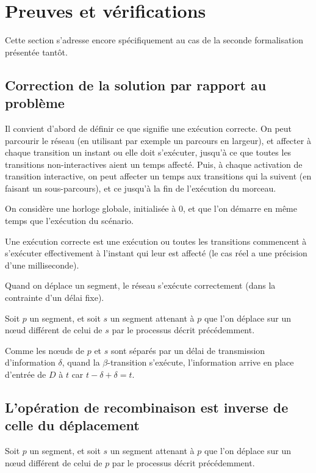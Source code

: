 \section{Preuves et vérifications}
Cette section s'adresse encore spécifiquement au cas de la seconde formalisation présentée tantôt.

\subsection{Correction de la solution par rapport au problème} 
Il convient d'abord de définir ce que signifie une exécution correcte.
On peut parcourir le réseau (en utilisant par exemple un parcours en largeur), et affecter à chaque transition un instant ou elle doit s'exécuter, jusqu'à ce que toutes les transitions non-interactives aient un temps affecté. Puis, à chaque activation de transition interactive, on peut affecter un temps aux transitions qui la suivent (en faisant un sous-parcours), et ce jusqu'à la fin de l'exécution du morceau.

On considère une horloge globale, initialisée à 0, et que l'on démarre en même temps que l'exécution du scénario.

Une exécution correcte est une exécution ou toutes les transitions commencent à s'exécuter effectivement à l'instant qui leur est affecté (le cas réel a une précision d'une milliseconde).

\begin{myth}
Quand on déplace un segment, le réseau s'exécute correctement (dans la contrainte d'un délai fixe).
\end{myth}

Soit $p$ un segment, et soit $s$ un segment attenant à $p$ que l'on déplace sur un nœud différent de celui de $s$ par le processus décrit précédemment.

Comme les nœuds de $p$ et $s$ sont séparés par un délai de transmission d'information $\delta$, quand la $\beta$-transition s'exécute, l'information arrive en place d'entrée de $D$ à $t$ car $t - \delta + \delta = t$.   

\subsection{L'opération de recombinaison est inverse de celle du déplacement}
Soit $p$ un segment, et soit $s$ un segment attenant à $p$ que l'on déplace sur un nœud différent de celui de $p$ par le processus décrit précédemment.

